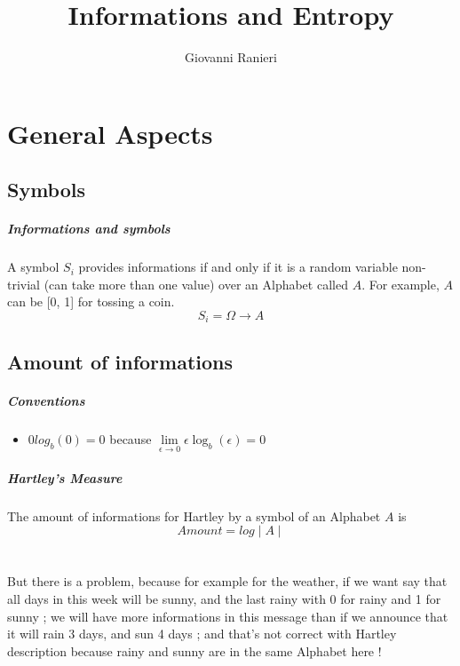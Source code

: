\documentclass{article}
\title{Informations and Entropy}
\author{Giovanni Ranieri}
\begin{document}
\maketitle

\section{General Aspects}

\subsection{Symbols}

\subparagraph{Informations and symbols} A symbol $ S_i $ provides informations if and only if it is a random variable non-trivial (can take more than one value) over an Alphabet called $ A $. For example, $ A $ can be [0, 1] for tossing a coin.
\begin{equation}
S_i = \Omega \rightarrow A
\end{equation}

\subsection{Amount of informations} 

\subparagraph{Conventions}
\begin{itemize}
\item $ 0log_b(0) = 0 $ because $ \lim\limits_{\epsilon \to 0}\epsilon \log_{b}(\epsilon) = 0 $
\end{itemize}

\subparagraph{Hartley's Measure} The amount of informations for Hartley by a symbol of an Alphabet $ A $ is
\begin{equation}
Amount = log \mid A \mid
\end{equation}
\\
\\
But there is a problem, because for example for the weather, if we want say that all days in this week will be sunny, and the last rainy with 0 for rainy and 1 for sunny ; we will have more informations in this message than if we announce that it will rain 3 days, and sun 4 days ; and that's not correct with Hartley description because rainy and sunny are in the same Alphabet here !
\end{document}
